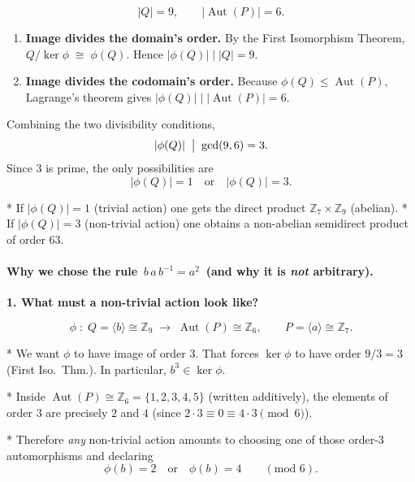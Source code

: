 \documentclass[12pt]{article}
\DeclareMathOperator{\Aut}{Aut}
\theoremstyle{definition} %
\theoremstyle{plain} %
\begin{document}
\[
     |Q| = 9,
     \qquad
     |\Aut(P)| = 6.
\]

\begin{enumerate}[label=\textit{\arabic*.},wide,labelwidth=0pt,labelsep=.8em]
    \item \textbf{Image divides the domain’s order.}\;
          By the First Isomorphism Theorem,
          \(
                Q/\ker\phi \;\cong\; \phi(Q)
          \).
          Hence
          \(
                \lvert\phi(Q)\rvert \mid |Q| = 9.
          \)

    \item \textbf{Image divides the codomain’s order.}\;
          Because \(\phi(Q)\le\Aut(P)\),
          Lagrange’s theorem gives
          \(
                \lvert\phi(Q)\rvert \mid |\Aut(P)| = 6.
          \)
\end{enumerate}

Combining the two divisibility conditions,
\[
       \lvert\phi(Q)\rvert \;\bigm|\; \gcd(9,6)=3.
\]
Since \(3\) is prime, the only possibilities are
\[
       \boxed{\lvert\phi(Q)\rvert=1 \quad\text{or}\quad \lvert\phi(Q)\rvert=3.}
\]

\smallskip
* If \(\lvert\phi(Q)\rvert=1\) (trivial action) one gets the direct product
  \(\mathbb{Z}_{7}\times\mathbb{Z}_{9}\) (abelian).  
* If \(\lvert\phi(Q)\rvert=3\) (non-trivial action) one obtains a
  non-abelian semidirect product of order \(63\).
  \paragraph{Why we chose the rule $\,b\,a\,b^{-1}=a^{2}\,$ (and why it is \emph{not} arbitrary).}

\medskip
\textbf{1.  What must a non-trivial action look like?}

\[
   \phi \;:\; Q=\langle b\rangle\cong\mathbb{Z}_{9} \;\longrightarrow\;
   \Aut(P)\cong\mathbb{Z}_{6},
\qquad P=\langle a\rangle\cong\mathbb{Z}_{7}.
\]

* We want $\phi$ to have image of order \(3\).  
  That forces \(\ker\phi\) to have order \(9/3=3\) (First Iso.\ Thm.).  
  In particular, \(b^{3}\in\ker\phi\).

* Inside \(\Aut(P)\cong\mathbb{Z}_{6}=\{1,2,3,4,5\}\) (written additively),
  the elements of order \(3\) are precisely \(2\) and \(4\)
  (since \(2\cdot3\equiv0\equiv4\cdot3\pmod 6\)).

* Therefore \emph{any} non-trivial action amounts to choosing one of
  those order-\(3\) automorphisms and declaring
  \[
       \phi(b)=2 
       \quad\text{or}\quad
       \phi(b)=4
       \qquad
       (\text{mod }6).
  \]
\end{document}
